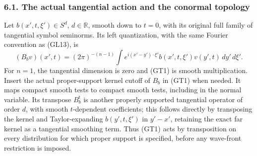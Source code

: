 \documentclass[
  11pt,
]{article}
\begin{document}
\subsubsection{6.1. The actual tangential action and the conormal
topology}\label{the-actual-tangential-action-and-the-conormal-topology}

Let \(b(x',t,\xi')\in S^d\), \(d\in\mathbb R\), smooth down to \(t=0\),
with its original full family of tangential symbol seminorms. Its left
quantization, with the same Fourier convention as (GL13), is \[
 (B_bv)(x',t)=(2\pi)^{-(n-1)}
     \int e^{i(x'-y')\cdot\xi'}b(x',t,\xi')v(y',t)
                  \,dy'\,d\xi'.
 \tag{GT1}
\] For \(n=1\), the tangential dimension is zero and (GT1) is smooth
multiplication. Insert the actual proper-support kernel cutoff of
\(B_b\) in (GT1) when needed. It maps compact smooth tests to compact
smooth tests, including in the normal variable. Its transpose
\(B_b^{\mathrm t}\) is another properly supported tangential operator of
order \(d\), with smooth \(t\)-dependent coefficients; this follows
directly by transposing the kernel and Taylor-expanding \(b(y',t,\xi')\)
in \(y'-x'\), retaining the exact far kernel as a tangential smoothing
term. Thus (GT1) acts by transposition on every distribution for which
proper support is specified, before any wave-front restriction is
imposed.
\end{document}
